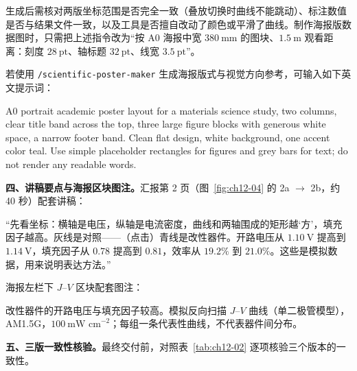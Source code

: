 生成后需核对两版坐标范围是否完全一致（叠放切换时曲线不能跳动）、标注数值是否与结果文件一致，以及工具是否擅自改动了颜色或平滑了曲线。制作海报版数据图时，只需把上述指令改为“按 A0 海报中宽 $380\ \text{mm}$ 的图块、$1.5\ \text{m}$ 观看距离：刻度 $28\ \text{pt}$、轴标题 $32\ \text{pt}$、线宽 $3.5\ \text{pt}$”。

若使用 \texttt{/scientific-poster-maker} 生成海报版式与视觉方向参考，可输入如下英文提示词：
\begin{Prompt}
A0 portrait academic poster layout for a materials science study, two columns,
clear title band across the top, three large figure blocks with generous white space,
a narrow footer band. Clean flat design, white background, one accent color teal.
Use simple placeholder rectangles for figures and grey bars for text;
do not render any readable words.
\end{Prompt}

\textbf{四、讲稿要点与海报区块图注。}汇报第 2 页（图~\ref{fig:ch12-04} 的 2a $\rightarrow$ 2b，约 40 秒）配套讲稿：
\begin{BookNote}
“先看坐标：横轴是电压，纵轴是电流密度，曲线和两轴围成的矩形越‘方’，填充因子越高。灰线是对照——（点击）青线是改性器件。开路电压从 $1.10\ \text{V}$ 提高到 $1.14\ \text{V}$，填充因子从 $0.78$ 提高到 $0.81$，效率从 $19.2\%$ 到 $21.0\%$。这些是模拟数据，用来说明表达方法。”
\end{BookNote}

海报左栏下 $J\text{--}V$ 区块配套图注：
\begin{BookNote}
改性器件的开路电压与填充因子较高。模拟反向扫描 $J\text{--}V$ 曲线（单二极管模型），AM1.5G，$100\ \text{mW cm}^{-2}$；每组一条代表性曲线，不代表器件间分布。
\end{BookNote}

\textbf{五、三版一致性核验。}最终交付前，对照表~\ref{tab:ch12-02} 逐项核验三个版本的一致性。

